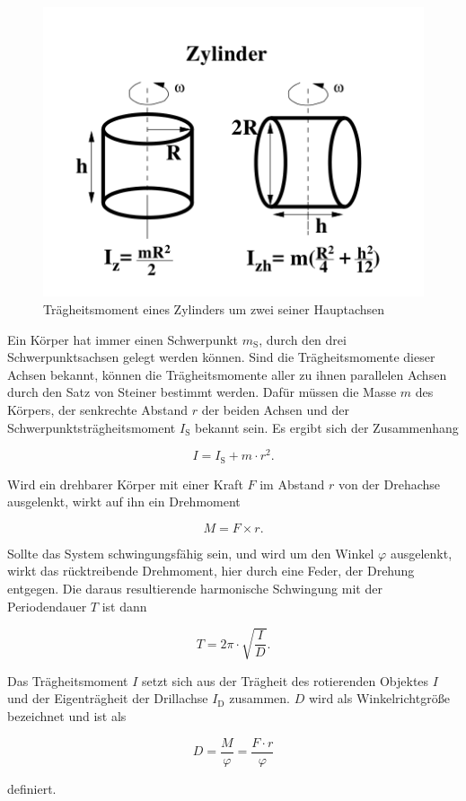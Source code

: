 \begin{figure}
    \centering
    \includegraphics[width=\textwidth/2]{images/zylinder.png}
    \caption{Trägheitsmoment eines Zylinders um zwei seiner Hauptachsen \cite{V101}}
    \label{fig:zylinder}
\end{figure}

Ein Körper hat immer einen Schwerpunkt $m_\text{S}$, durch den drei Schwerpunktsachsen gelegt werden können. 
Sind die Trägheitsmomente dieser Achsen bekannt, können die Trägheitsmomente aller zu ihnen parallelen Achsen durch den Satz von Steiner bestimmt werden. 
Dafür müssen die Masse $m$ des Körpers, der senkrechte Abstand $r$ der beiden Achsen und der Schwerpunktsträgheitsmoment $I_\text{S}$ bekannt sein. Es ergibt sich der Zusammenhang 

\begin{equation}
    I = I_\text{S} + m \cdot r^2.
    \label{eq:steiner}
\end{equation}

Wird ein drehbarer Körper mit einer Kraft $F$ im Abstand $r$ von der Drehachse ausgelenkt, wirkt auf ihn ein Drehmoment

\begin{equation}
    M = F \times r.
    \label{eq:drehmoment}
\end{equation}

Sollte das System schwingungsfähig sein, und wird um den Winkel $\varphi$ ausgelenkt, wirkt das rücktreibende Drehmoment, hier durch eine Feder, der Drehung entgegen. Die daraus resultierende harmonische Schwingung mit der Periodendauer $T$ ist dann

\begin{equation}
    T = 2\pi \cdot \sqrt{\frac{I}{D}}.
    \label{eq:periodendauer}
\end{equation}

Das Trägheitsmoment $I$ setzt sich aus der Trägheit des rotierenden Objektes $I$ und der Eigenträgheit der Drillachse $I_\text{D}$ zusammen. $D$ wird als Winkelrichtgröße bezeichnet und ist als 

\begin{equation}
    D = \frac{M}{\varphi} = \frac{F \cdot r}{\varphi}
    \label{eq:winkelrichtgroesse}
\end{equation}

definiert. 